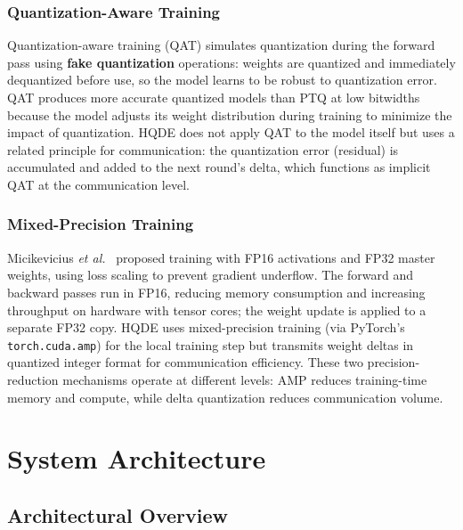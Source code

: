 \documentclass[journal,twoside]{IEEEtran}
\newcommand{\hqde}{\mbox{HQDE}\xspace}
\newcommand{\etal}{\textit{et al.}\xspace}
\begin{document}
\subsubsection{Quantization-Aware Training}

Quantization-aware training (QAT) simulates quantization during the
forward pass using \textbf{fake quantization} operations: weights are
quantized and immediately dequantized before use, so the model learns
to be robust to quantization error. QAT produces more accurate
quantized models than PTQ at low bitwidths because the model adjusts
its weight distribution during training to minimize the impact of
quantization. \hqde{} does not apply QAT to the model itself but uses
a related principle for communication: the quantization error
(residual) is accumulated and added to the next round's delta,
which functions as implicit QAT at the communication level.

\subsubsection{Mixed-Precision Training}

Micikevicius \etal~\cite{micikevicius2018mixed} proposed training with
FP16 activations and FP32 master weights, using loss scaling to prevent
gradient underflow. The forward and backward passes run in FP16,
reducing memory consumption and increasing throughput on hardware with
tensor cores; the weight update is applied to a separate FP32 copy.
\hqde{} uses mixed-precision training (via PyTorch's
\texttt{torch.cuda.amp}) for the local training step but transmits
weight deltas in quantized integer format for communication efficiency.
These two precision-reduction mechanisms operate at different levels:
AMP reduces training-time memory and compute, while delta quantization
reduces communication volume.

\section{System Architecture}
\label{sec:arch}

\subsection{Architectural Overview}
\end{document}
